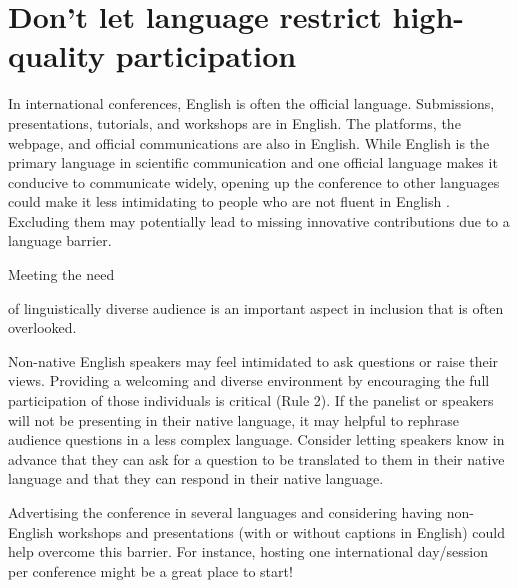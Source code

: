 \documentclass[10pt,letterpaper]{article}
\begin{document}
\section{Don't let language restrict high-quality participation}
\label{rule_language}

In international conferences, English is often the official language. Submissions, presentations, tutorials, and workshops are in English. The platforms, the webpage, and official communications are also in English. While English is the primary language in scientific communication and one official language makes it conducive to communicate widely, opening up the conference to other languages could make it less intimidating to people who are not fluent in English \cite{ninerBetterWhomLeveling2021}. Excluding them may potentially lead to missing innovative contributions due to a language barrier. 

Meeting the need 

of linguistically diverse audience is an important aspect in inclusion that is often overlooked.

 Non-native English speakers may feel intimidated to ask questions or raise their views. Providing a welcoming and diverse environment by encouraging the full participation of those individuals is critical (Rule 2). If the panelist or speakers will not be presenting in their native language, it may helpful to rephrase audience questions in a less complex language. Consider letting speakers know in advance that they can ask for a question to be translated to them in their native language and that they can respond in their native language.

Advertising the conference in several languages and considering having non-English workshops and presentations (with or without captions in English) could help overcome this barrier. For instance, hosting one international day/session per conference might be a great place to start!
\end{document}
